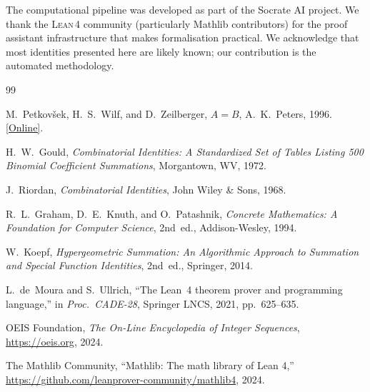\documentclass[11pt,a4paper]{article}
\theoremstyle{definition}
\theoremstyle{remark}
\newcommand{\lean}{\textsc{Lean\,4}}
\begin{document}
The computational pipeline was developed as part of the Socrate AI
project. We thank the \lean{} community (particularly Mathlib
contributors) for the proof assistant infrastructure that makes
formalisation practical.
We acknowledge that most identities presented here are likely known;
our contribution is the automated methodology.


\begin{thebibliography}{99}

M.~Petkov\v{s}ek, H.~S.~Wilf, and D.~Zeilberger,
\emph{$A=B$},
A.~K.~Peters, 1996.
\href{https://www.math.upenn.edu/~wilf/AesqualB.pdf}{[Online]}.

H.~W.~Gould,
\emph{Combinatorial Identities: A Standardized Set of Tables
Listing 500 Binomial Coefficient Summations},
Morgantown, WV, 1972.

J.~Riordan,
\emph{Combinatorial Identities},
John Wiley \& Sons, 1968.

R.~L.~Graham, D.~E.~Knuth, and O.~Patashnik,
\emph{Concrete Mathematics: A Foundation for Computer Science},
2nd~ed., Addison-Wesley, 1994.

W.~Koepf,
\emph{Hypergeometric Summation: An Algorithmic Approach to Summation
and Special Function Identities},
2nd~ed., Springer, 2014.

L.~de~Moura and S.~Ullrich,
``The Lean~4 theorem prover and programming language,''
in \emph{Proc.\ CADE-28}, Springer LNCS, 2021, pp.~625--635.

OEIS Foundation,
\emph{The On-Line Encyclopedia of Integer Sequences},
\url{https://oeis.org}, 2024.

The Mathlib Community,
``Mathlib: The math library of Lean 4,''
\url{https://github.com/leanprover-community/mathlib4}, 2024.

\end{thebibliography}
\end{document}
